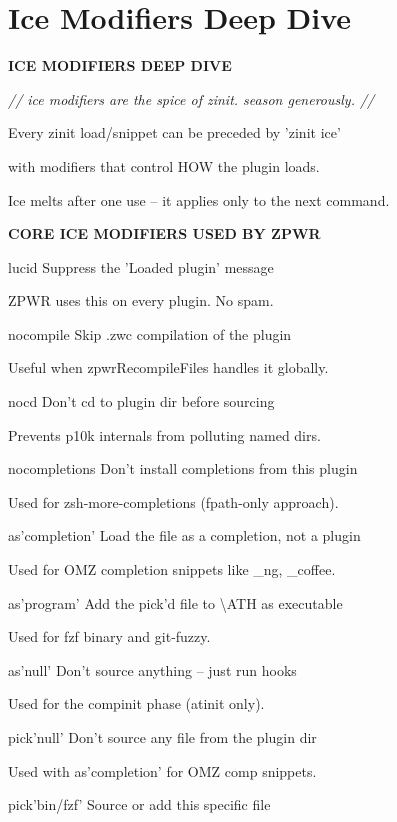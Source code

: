 \documentclass[11pt,a4paper,twoside]{book}
\begin{document}
\section{Ice Modifiers Deep Dive}


\vspace{10pt}
{\large\bfseries\color{neoncyan} ICE MODIFIERS DEEP DIVE}\vspace{6pt}

{\small\itshape\color{dimtext} // ice modifiers are the spice of zinit. season generously. //}

Every zinit load/snippet can be preceded by 'zinit ice'

with modifiers that control HOW the plugin loads.

Ice melts after one use -- it applies only to the next command.


\vspace{12pt}
{\bfseries\color{neonyellow} CORE ICE MODIFIERS USED BY ZPWR}\vspace{4pt}

lucid          Suppress the 'Loaded plugin' message

ZPWR uses this on every plugin. No spam.

nocompile      Skip .zwc compilation of the plugin

Useful when zpwrRecompileFiles handles it globally.

nocd           Don't cd to plugin dir before sourcing

Prevents p10k internals from polluting named dirs.

nocompletions  Don't install completions from this plugin

Used for zsh-more-completions (fpath-only approach).

as'completion' Load the file as a completion, not a plugin

Used for OMZ completion snippets like \_ng, \_coffee.

as'program'    Add the pick'd file to \textbackslash{}ATH as executable

Used for fzf binary and git-fuzzy.

as'null'       Don't source anything -- just run hooks

Used for the compinit phase (atinit only).

pick'null'     Don't source any file from the plugin dir

Used with as'completion' for OMZ comp snippets.

pick'bin/fzf'  Source or add this specific file
\end{document}
